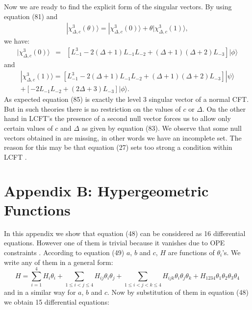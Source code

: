 \documentclass[a4paper,11pt]{article}
\begin{document}
Now we are ready to find the explicit form of the singular
vectors. By using equation (81) and
\begin{eqnarray}
|\chi_{\Delta,c}^{3}(\theta)\rangle
=|\chi_{\Delta,c}^{3}(0)\rangle+\theta|\chi_{\Delta,c}^{3}(1)\rangle,
\end{eqnarray}
we have:
\begin{eqnarray}
|\chi_{\Delta,c}^{3}(0)\rangle &
=&[L^{3}_{-1}-2(\Delta+1)L_{-1}L_{-2}+(\Delta+1)(\Delta+2)L_{-3}]
|\phi \rangle
\end{eqnarray}
and
\begin{eqnarray}
|\chi_{\Delta,c}^{3}(1)\rangle=[L^{3}_{-1}-2(\Delta+1)L_{-1}L_{-2}
+(\Delta+1)(\Delta+2)L_{-3}]|\psi \rangle\nonumber\\
+[-2L_{-1}L_{-2}+(2\Delta+3)L_{-3}]|\phi \rangle.
\end{eqnarray}
As expected equation (85) is exactly the level 3 singular vector
of a normal CFT. But in such theories there is no restriction on
the values of $c$ or $\Delta$. On the other hand in LCFT's the
presence of a second null vector forces us to allow only certain
values of $c$ and $\Delta$ as given by equation (83). We observe
that some null vectors obtained in \cite{Fl-Sing} are missing, in
other words we have an incomplete set. The reason for this may be
that equation (27) sets too strong a condition within LCFT
\cite{Private}.
\section{Appendix B: Hypergeometric Functions}
In this appendix we show that equation (48) can be considered as
16 differential equations. However one of them is trivial because
it vanishes due to OPE constraints \cite{MRS,FlohrNew}. According
to equation (49) $a$, $b$ and $c$, $H$ are functions of
$\theta_{i}$'s. We write any of them in a general form:
\begin{equation}
H=\sum_{i=1}^{4}H_{i}\theta_{i}+\sum_{1\leq
i<j\leq4}H_{ij}\theta_{i}\theta_{j}+ \sum_{1\leq
i<j<k\leq4}H_{ijk}\theta_{i}\theta_{j}\theta_{k}+H_{1234}
\theta_{1}\theta_{2}\theta_{3}\theta_{4}
\end{equation}
and in a similar way for $a$, $b$ and $c$. Now by substitution of
them in equation (48) we obtain 15 differential equations:
\end{document}
